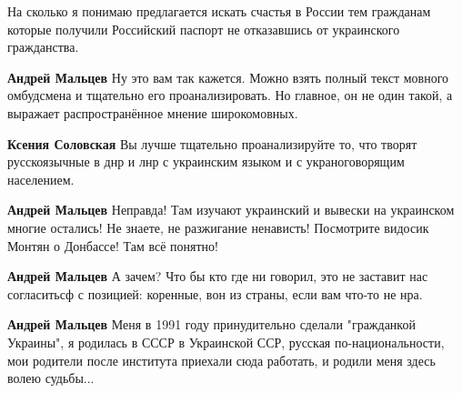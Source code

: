 \begin{itemize}
\begin{itemize}
На сколько я понимаю предлагается искать счастья в России тем гражданам которые
получили Российский паспорт не отказавшись от украинского гражданства.


 
\textbf{Андрей Мальцев} Ну это вам так кажется. Можно взять полный текст
мовного омбудсмена и тщательно его проанализировать. Но главное, он не один
такой, а выражает распространённое мнение широкомовных.

 
\textbf{Ксения Соловская} Вы лучше тщательно проанализируйте то, что творят русскоязычные в днр и лнр с украинским языком и с украноговорящим населением.

 
\textbf{Андрей Мальцев} Неправда! Там изучают украинский и вывески на украинском
многие остались! Не знаете, не разжигание ненависть! Посмотрите видосик Монтян о
Донбассе! Там всё понятно!

 
\textbf{Андрей Мальцев} А зачем? Что бы кто где ни говорил, это не заставит нас согласитьсф с позицией: коренные, вон из страны, если вам что-то не нра.

 
\textbf{Андрей Мальцев} Меня в 1991 году принудительно сделали "гражданкой
Украины", я родилась в СССР в Украинской ССР, русская по-национальности, мои
родители после института приехали сюда работать, и родили меня здесь волею
судьбы...


\end{itemize}
\end{itemize}
